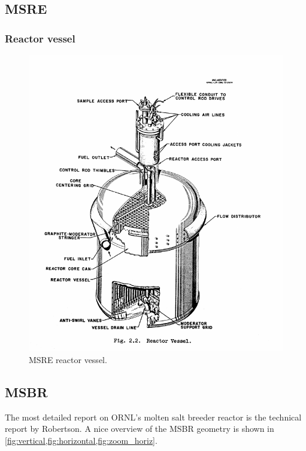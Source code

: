 \documentclass{article}
\begin{document}
\subsection{MSRE}

\subsubsection{Reactor vessel}

\begin{figure}[htpb]
  \centering
  \includegraphics{MSRE_reactor_vessel.png}
  \caption{MSRE reactor vessel. \cite{robertson_msre_1965}}
  \label{fig:MSRE_reactor}
\end{figure}

\subsection{MSBR}

The most detailed report on ORNL's molten salt breeder reactor is the technical
report by Robertson. \cite{robertson_conceptual_1971} A nice overview of the
MSBR geometry is shown in \cref{fig:vertical,fig:horizontal,fig:zoom_horiz}.
\end{document}
